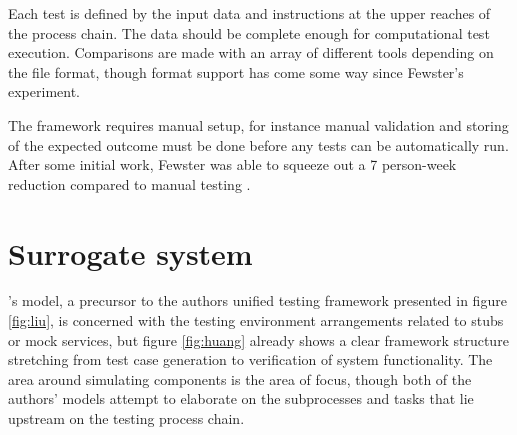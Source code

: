 \documentclass[12pt,a4paper,oneside,pdftex]{report}
\begin{document}
Each test is defined by the input data and instructions at the upper reaches of the process chain. The data should be complete enough for computational test execution. Comparisons are made with an array of different tools depending on the file format, though format support has come some way since Fewster's experiment.

The framework requires manual setup, for instance manual validation and storing of the expected outcome must be done before any tests can be automatically run. After some initial work, Fewster was able to squeeze out a 7 person-week reduction compared to manual testing \citep{fewster1999software}.

\section{Surrogate system}

\citeauthor{huang2008surrogate}'s \citeyearpar{huang2008surrogate} model, a precursor to the authors unified testing framework presented in figure \ref{fig:liu}, is concerned with the testing environment arrangements related to stubs or mock services, but figure \ref{fig:huang} already shows a clear framework structure stretching from test case generation to verification of system functionality. The area around simulating components is the area of focus, though both of the authors' models attempt to elaborate on the subprocesses and tasks that lie upstream on the testing process chain. \citep{huang2008surrogate}

\begin{comment}
\begin{figure}[H]
\centering
\pgfdeclarelayer{marx}
\pgfsetlayers{main,marx}
\begin{tikzpicture}[
    start chain=going below,    %
    node distance=3mm and 30mm, %
    ]
\tikzset{
  base/.style={draw, on chain, on grid, align=center, minimum height=4ex},
  proc/.style={base, rectangle, minimum height=4em, text width=4em},
  cont/.style={base, rectangle, rounded corners, minimum height=4em, minimum width=6em, text width=6em},
  elli/.style={base, ellipse, minimum height=4.5em, text width=4.5em},
  line/.style={draw, thick, -latex'}
}
\node [proc] (desc) {Service description};
\node [proc] (tcs) {Configured test cases};
\node [proc, right=of desc] (gen) {Generator};
\node [proc] (ten) {Test engine};
\node [cont, right=of gen] (app) {Application container};
\node [proc] (sgt) {Surrogate};
\node [proc] (sen) {Surrogate engine};
\node [proc, right=of sgt] (rea) {Real component};
\path [line] (desc) -- (gen);
\path [line] (gen) -- (sgt);
\path [line] (tcs) -- (ten);
\path [line] (ten) -- (sen);
\path [line] (sgt) -- (sen);
\path [line] (sen) -- (sgt);
\end{tikzpicture}
\caption{Surrogate system architecture \citep{huang2008surrogate}} \label{fig:surrogate}
\end{figure}
\end{comment}
\end{document}
